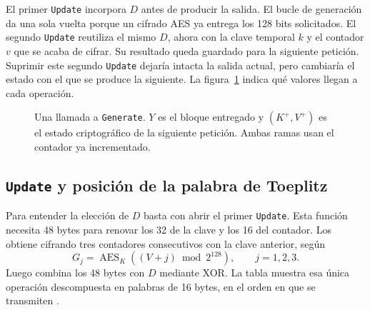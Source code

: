 \documentclass[11pt,a4paper]{article}
\newcommand{\Enc}{\operatorname{AES}}
\begin{document}
El primer \texttt{Update} incorpora \(D\) antes de producir la salida. El bucle de generación da una sola vuelta porque un cifrado AES ya entrega los 128 bits solicitados. El segundo \texttt{Update} reutiliza el mismo \(D\), ahora con la clave temporal \(k\) y el contador \(v\) que se acaba de cifrar. Su resultado queda guardado para la siguiente petición. Suprimir este segundo \texttt{Update} dejaría intacta la salida actual, pero cambiaría el estado con el que se produce la siguiente. La figura~\ref{fig:ctr} indica qué valores llegan a cada operación.

\begin{figure}[htbp]\centering
{}
\caption{Una llamada a \texttt{Generate}. \(Y\) es el bloque entregado y \((K^+,V^+)\) es el estado criptográfico de la siguiente petición. Ambas ramas usan el contador ya incrementado.}\label{fig:ctr}
\end{figure}

\subsection{\texttt{Update} y posición de la palabra de Toeplitz}
Para entender la elección de \(D\) basta con abrir el primer \texttt{Update}. Esta función necesita 48 bytes para renovar los 32 de la clave y los 16 del contador. Los obtiene cifrando tres contadores consecutivos con la clave anterior, según
\begin{equation}
 G_j=\Enc_K((V+j)\bmod 2^{128}),\qquad j=1,2,3 .
 \label{eq:update}
\end{equation}
Luego combina los 48 bytes con \(D\) mediante XOR. La tabla muestra esa única operación descompuesta en palabras de 16 bytes, en el orden en que se transmiten \cite[§10.2.1.2, pasos~2--7]{nist90a}.
\end{document}
